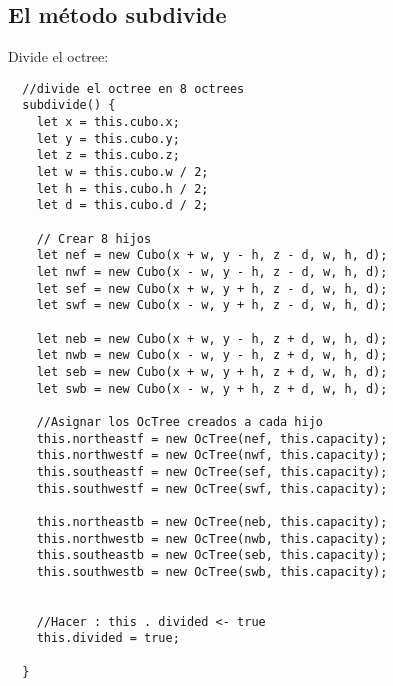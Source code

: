 \subsection{El método subdivide}
Divide el octree:
\begin{lstlisting}
  //divide el octree en 8 octrees
  subdivide() {
    let x = this.cubo.x;
    let y = this.cubo.y;
    let z = this.cubo.z;
    let w = this.cubo.w / 2;
    let h = this.cubo.h / 2;
    let d = this.cubo.d / 2;

    // Crear 8 hijos
    let nef = new Cubo(x + w, y - h, z - d, w, h, d);
    let nwf = new Cubo(x - w, y - h, z - d, w, h, d);
    let sef = new Cubo(x + w, y + h, z - d, w, h, d);
    let swf = new Cubo(x - w, y + h, z - d, w, h, d);

    let neb = new Cubo(x + w, y - h, z + d, w, h, d);
    let nwb = new Cubo(x - w, y - h, z + d, w, h, d);
    let seb = new Cubo(x + w, y + h, z + d, w, h, d);
    let swb = new Cubo(x - w, y + h, z + d, w, h, d);

    //Asignar los OcTree creados a cada hijo
    this.northeastf = new OcTree(nef, this.capacity);
    this.northwestf = new OcTree(nwf, this.capacity);
    this.southeastf = new OcTree(sef, this.capacity);
    this.southwestf = new OcTree(swf, this.capacity);

    this.northeastb = new OcTree(neb, this.capacity);
    this.northwestb = new OcTree(nwb, this.capacity);
    this.southeastb = new OcTree(seb, this.capacity);
    this.southwestb = new OcTree(swb, this.capacity);


    //Hacer : this . divided <- true
    this.divided = true;

  }  
\end{lstlisting}





\iffalse
Como se muestra en la figuras \ref{fig:act-1_a} y \ref{fig:act-1_b}.
\begin{figure}[H]
\centering
\begin{minipage}{0.45\textwidth}
  \centering
  \texttt{[image: act-1\_a]}
  \caption{Envío de \textit{ICMP ECHO REQUEST} de PC0 a PC1, PC2 y PC3.}
  \label{fig:act-1_a}
\end{minipage}\hfill
\begin{minipage}{0.45\textwidth}
  \centering
  \texttt{[image: act-1\_b]}
  \caption{Respuesta de PC1, PC2 y PC3. Tabla ARP de PC0.}
  \label{fig:act-1_b}
\end{minipage}
\end{figure}
Como se muestra en la figura \ref{fig:act-3}
\begin{figure}[H]
  \centering
  \texttt{[image: act-3]}
  \caption{Tabla de subneteo para la red 192.168.100.0.}
  \label{fig:act-3}
\end{figure}
\fi